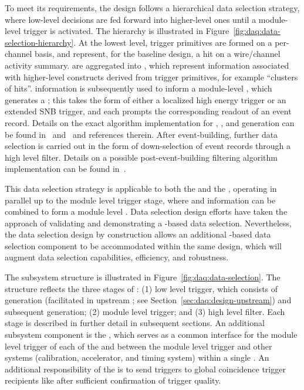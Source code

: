 To meet its requirements, the  design follows a hierarchical data selection strategy, 
where low-level decisions are fed forward into higher-level ones until a module-level trigger is activated. 
The hierarchy is illustrated in
Figure~\ref{fig:daq:data-selection-hierarchy}. 
At the lowest level, trigger primitives are formed on a per-channel basis, and represent, for the baseline design, a hit on a wire/channel activity summary. 
 are aggregated into , which represent information associated with higher-level constructs derived from trigger primitives, for example ``clusters of hits''. 
 information is subsequently used to inform a
module-level , which generates a ;
this takes the form of either a localized high energy trigger or an
extended SNB trigger, and each prompts the corresponding readout of an
event record. Details on the
exact algorithm implementation for , , and  generation can be found
in~ and~ and references therein. 
After event-building, further data selection is carried out in the form
of down-selection of event records through a high level
filter. Details on a possible post-event-building filtering algorithm
implementation can be found in~.

This data selection strategy is applicable to both the  and
the , operating in parallel up to the module level trigger stage, where  and  information can be combined to form a module level . 
Data selection design efforts have taken the approach of validating
and demonstrating a -based data selection. Nevertheless,
the data selection design by construction allows an additional
-based data selection component to be accommodated within
the same design, which will augment data selection capabilities, efficiency, and robustness.

The  subsystem structure is illustrated in
Figure~\ref{fig:daq:data-selection}. The structure
reflects the three stages of : (1) low level trigger, which consists of
 generation (facilitated in upstream ; see
Section~\ref{sec:daq:design-upstream}) and subsequent
 generation; (2) module level trigger; and (3)
high level filter. Each stage is described in further detail in subsequent
sections. An additional subsystem component is the ,
which serves as a common interface for the
module level trigger of each of the   and between
the module level trigger and other systems (calibration,
accelerator, and timing system) within a single
. An additional responsibility of the
 is to send  triggers
to global coincidence trigger recipients like 
\cite{snews} after sufficient confirmation of trigger quality.

